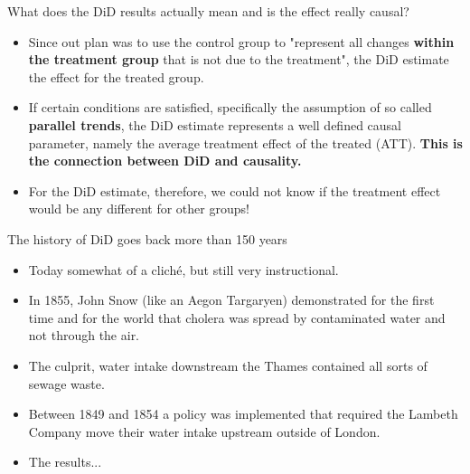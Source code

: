 \documentclass[notes,11pt, aspectratio=169]{beamer}
\begin{document}
\begin{frame}{What does the DiD results actually mean and is the effect really causal?}
        \begin{itemize}        
        \item Since out plan was to use the control group to "represent all changes \textbf{within the treatment group} that is not due to the treatment", the DiD estimate the effect for the treated group. 

        \item If certain conditions are satisfied, specifically the assumption of so called \textbf{parallel trends}, the DiD estimate represents a well defined causal parameter, namely the average treatment effect of the treated (ATT). \textbf{This is the connection between DiD and causality.}
        \item For the DiD estimate, therefore, we could not know if the treatment effect would be any different for other groups!        
    \end{itemize}
\end{frame}

\begin{frame}{The history of DiD goes back more than 150 years}
    \begin{itemize}
        \item Today somewhat of a cliché, but still very instructional.
        \item In 1855, John Snow (like an Aegon Targaryen) demonstrated for the first time and for the world that cholera was spread by contaminated water and not through the air. 
        \item The culprit, water intake downstream the Thames contained all sorts of sewage waste.
        \item Between 1849 and 1854 a policy was implemented that required the Lambeth Company move their water intake upstream outside of London. 
        \item The results...        
    \end{itemize}
\end{frame}
\end{document}
